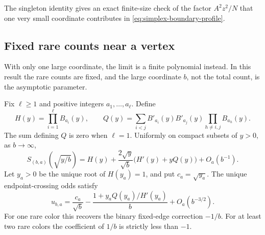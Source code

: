 The singleton identity gives an exact finite-size check of the factor
$A^2z^2/N$ that one very small coordinate contributes in
\eqref{eq:simplex-boundary-profile}.

\subsection{Fixed rare counts near a vertex}

With only one large coordinate, the limit is a finite polynomial instead.
In this result the rare counts are fixed, and the large coordinate $b$,
not the total count, is the asymptotic parameter.

\begin{theorem}
\label{thm:simplex-fixed-vertex}
Fix $\ell\ge1$ and positive integers $a_1,\ldots,a_\ell$. Define
\[
H(y)=\prod_{i=1}^\ell B_{a_i}(y),\qquad
Q(y)=\sum_{i<j}B'_{a_i}(y)B'_{a_j}(y)
\prod_{h\ne i,j}B_{a_h}(y).
\]
The sum defining $Q$ is zero when $\ell=1$. Uniformly on compact
subsets of $y>0$, as $b\to\infty$,
\begin{equation}\label{eq:simplex-vertex-ratio}
S_{(b,a)}\!\left(\sqrt{y/b}\right)
=H(y)+\frac{2\sqrt y}{\sqrt b}\bigl(H'(y)+yQ(y)\bigr)
+O_a(b^{-1}).
\end{equation}
Let $y_a>0$ be the unique root of $H(y_a)=1$, and put $c_a=\sqrt{y_a}$.
The unique endpoint-crossing odds satisfy
\begin{equation}\label{eq:simplex-vertex-root}
u_{b,a}=\frac{c_a}{\sqrt b}
-\frac{1+y_aQ(y_a)/H'(y_a)}{b}
+O_a(b^{-3/2}).
\end{equation}
For one rare color this recovers the binary fixed-edge correction $-1/b$.
For at least two rare colors the coefficient of $1/b$ is strictly less
than $-1$.
\end{theorem}

